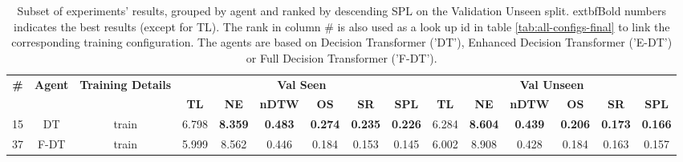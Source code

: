 \begin{table}
\centering
\caption{\label{tab:spatial_features}Subset of experiments' results, grouped by agent and ranked by descending SPL on the Validation Unseen split. 	extbf{Bold} numbers indicates the best results (except for TL). The rank in column \# is also used as a look up id in table \ref{tab:all-configs-final} to link the corresponding training configuration.     \newline The agents are based on Decision Transformer ('DT'), Enhanced Decision Transformer ('E-DT') or Full Decision Transformer ('F-DT').}
\begin{tabular}{@{\hskip3pt}c@{\hskip3pt}c@{\hskip3pt}c@{\hskip3pt}c@{\hskip3pt}c@{\hskip3pt}c@{\hskip3pt}c@{\hskip3pt}c@{\hskip3pt}c@{\hskip3pt}c@{\hskip3pt}c@{\hskip3pt}c@{\hskip3pt}c@{\hskip3pt}c@{\hskip3pt}c}
\toprule
\textbf{\#} & \textbf{Agent} & \textbf{Training Details} & \multicolumn{6}{c}{\textbf{Val Seen}} & \multicolumn{6}{c}{\textbf{Val Unseen}} \\
 \textbf{~} &     \textbf{~} &                \textbf{~} &       \textbf{TL} &     \textbf{NE} &   \textbf{nDTW} &     \textbf{OS} &     \textbf{SR} &    \textbf{SPL} &         \textbf{TL} &     \textbf{NE} &   \textbf{nDTW} &     \textbf{OS} &     \textbf{SR} &    \textbf{SPL} \\
\midrule
         15 &             DT &                     train &             6.798 &  \textbf{8.359} &  \textbf{0.483} &  \textbf{0.274} &  \textbf{0.235} &  \textbf{0.226} &               6.284 &  \textbf{8.604} &  \textbf{0.439} &  \textbf{0.206} &  \textbf{0.173} &  \textbf{0.166} \\
         37 &           F-DT &                     train &             5.999 &           8.562 &           0.446 &           0.184 &           0.153 &           0.145 &               6.002 &           8.908 &           0.428 &           0.184 &           0.163 &           0.157 \\
\bottomrule
\end{tabular}
\end{table}
